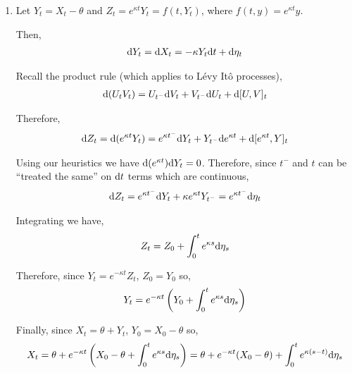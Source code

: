 \documentclass[10pt]{article}
\begin{document}
\begin{solution}[Solution]
\begin{enumerate}[label=(\alph*)]
    \item 
        Let \( Y_t = X_t - \theta \) and \( Z_t = e^{\kappa t}Y_t = f(t,Y_t)  \), where \( f(t,y) = e^{\kappa t}y \).

        Then,
        \begin{align*}
            \mathrm{d} Y_t = \mathrm{d} X_t = -\kappa Y_t \mathrm{d} t + \mathrm{d} \eta_t
        \end{align*}

        Recall the product rule (which applies to L\'evy It\^o processes),
        \begin{align*}
            \mathrm{d}(U_tV_t) = U_{t^-}\mathrm{d} V_t + V_{t^-}\mathrm{d} U_t + \mathrm{d}[U,V]_t
        \end{align*}
        

        Therefore,
        \begin{align*}
            \mathrm{d} Z_t 
            = \mathrm{d} (e^{\kappa t} Y_t) 
            = e^{\kappa t^-}\mathrm{d} Y_t + Y_{t^-} \mathrm{d} e^{\kappa t} + \mathrm{d}[e^{\kappa t},Y]_t 
        \end{align*}
      


        Using our heuristics we have \( \mathrm{d} (e^{\kappa t}) \mathrm{d} Y_t = 0 \). Therefore, since \( t^- \) and \( t \) can be ``treated the same'' on \( \mathrm{d} t \) terms which are continuous,
        \begin{align*}
            \mathrm{d} Z_t = e^{\kappa t^-} \mathrm{d} Y_t + \kappa e^{\kappa t} Y_{t^-} 
            = e^{\kappa t^-} \mathrm{d} \eta_t
        \end{align*}
        
        Integrating we have,
        \begin{align*}
            Z_t = Z_0 + \int_{0}^{t} e^{\kappa s} \mathrm{d} \eta_s
        \end{align*}

        Therefore, since \( Y_t = e^{-\kappa t}Z_t \), \( Z_0 = Y_0 \) so,
        \begin{align*}
            Y_t 
            = e^{-\kappa t} \left( Y_0 + \int_{0}^{t} e^{\kappa s} \mathrm{d} \eta_s \right)
        \end{align*}
        
        Finally, since \( X_t = \theta + Y_t \), \( Y_0 = X_0 - \theta \) so,
        \begin{align*}
            X_t = \theta + e^{-\kappa t} \left( X_0 - \theta + \int_{0}^{t} e^{\kappa s} \mathrm{d} \eta_s \right)
            = \theta + e^{-\kappa t}(X_0 - \theta) + \int_{0}^{t} e^{\kappa(s-t)} \mathrm{d} \eta_s
        \end{align*}
        

\end{enumerate}
\end{solution}
\end{document}
